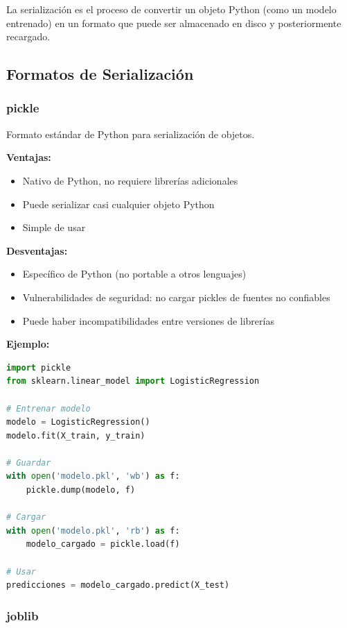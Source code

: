 \documentclass[11pt,a4paper]{article}
\begin{document}
La serialización es el proceso de convertir un objeto Python (como un modelo entrenado) en un formato que puede ser almacenado en disco y posteriormente recargado.

\subsection{Formatos de Serialización}

\subsubsection{pickle}

Formato estándar de Python para serialización de objetos.

\textbf{Ventajas:}
\begin{itemize}
\item Nativo de Python, no requiere librerías adicionales
\item Puede serializar casi cualquier objeto Python
\item Simple de usar
\end{itemize}

\textbf{Desventajas:}
\begin{itemize}
\item Específico de Python (no portable a otros lenguajes)
\item Vulnerabilidades de seguridad: no cargar pickles de fuentes no confiables
\item Puede haber incompatibilidades entre versiones de librerías
\end{itemize}

\textbf{Ejemplo:}
\begin{lstlisting}[language=Python]
import pickle
from sklearn.linear_model import LogisticRegression

# Entrenar modelo
modelo = LogisticRegression()
modelo.fit(X_train, y_train)

# Guardar
with open('modelo.pkl', 'wb') as f:
    pickle.dump(modelo, f)

# Cargar
with open('modelo.pkl', 'rb') as f:
    modelo_cargado = pickle.load(f)

# Usar
predicciones = modelo_cargado.predict(X_test)
\end{lstlisting}

\subsubsection{joblib}
\end{document}
